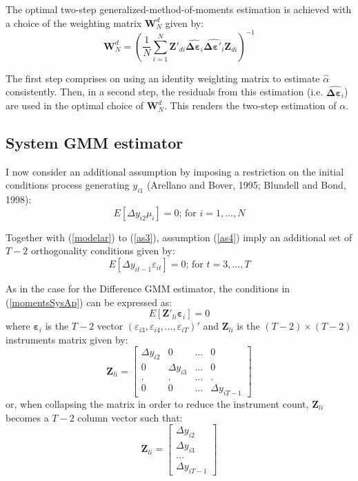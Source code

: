 \documentclass[11pt]{amsart}
\begin{document}
The optimal two-step generalized-method-of-moments estimation is achieved with a choice of the weighting matrix $\mathbf{W}_{N}^d$ given by:
\[
\mathbf{W}_{N}^d=\left( \frac{1}{N} \sum\limits_{i=1}^{N} \mathbf{Z}'_{di} \hat{ \mathbf{\Delta \varepsilon}_i} \hat{ \mathbf{\Delta \varepsilon}'_i} \mathbf{Z}_{di} \right)^{-1}
\]

The first step comprises on using an identity weighting matrix to estimate $\hat \alpha$ consistently. Then, in a second step, the residuals from this estimation (i.e. $\hat{\mathbf{\Delta \varepsilon}_i}$) are used in the optimal choice of $\mathbf{W}_{N}^d$. This renders the two-step estimation of $ \alpha$.

\subsection{System GMM estimator}

I now consider an additional assumption by imposing a restriction on the initial conditions process generating $y_{i1}$ (Arellano and Bover, 1995; Blundell and Bond, 1998):
\begin{equation}
\label{as4}
\tag{6'}
E\left[\Delta y_{i2}\mu_{i}\right]=0\text{; for $i=1,...,N$}
\end{equation}

Together with (\ref{modelar}) to (\ref{as3}), assumption (\ref{as4}) imply an additional set of $T-2$ orthogonality conditions given by:
\begin{equation}
\label{momentsSysAp}
\tag{7'}
E\left[\Delta y_{it-1} \varepsilon_{it}\right]=0 \text{; for $t=3,...,T$}
\end{equation}

As in the case for the Difference GMM estimator, the conditions in (\ref{momentsSysAp}) can be expressed as:
\begin{equation*}
E\left[ \mathbf{Z}'_{li}\mathbf{ \varepsilon}_{i}\right]=0
\end{equation*}
where $\mathbf{\varepsilon}_{i}$ is the $T-2$ vector $( \varepsilon_{i3}, \varepsilon_{i4},..., \varepsilon_{iT})'$ and $\mathbf{Z}_{li}$ is the $(T-2)\times (T-2)$ instruments matrix given by:
\[
\mathbf{Z}_{li} = 
\left[ {\begin{array}{*{20}{c}}
{\Delta {y_{i2}}}&0&{...}&0\\
0&{\Delta {y_{i3}}}&{...}&0\\
.&.&{...}&.\\
0&0&{...}&{\Delta {y_{iT - 1}}}
\end{array}} \right]
\]
or, when collapsing the matrix in order to reduce the instrument count, $\mathbf{Z}_{li}$ becomes a $T-2$ column vector such that:
\[
\mathbf{Z}_{li} = 
\left[ {\begin{array}{*{20}{c}}
{\Delta {y_{i2}}}\\
{\Delta {y_{i3}}}\\
{...}\\
{\Delta {y_{iT - 1}}}
\end{array}} \right]
\]
\end{document}
